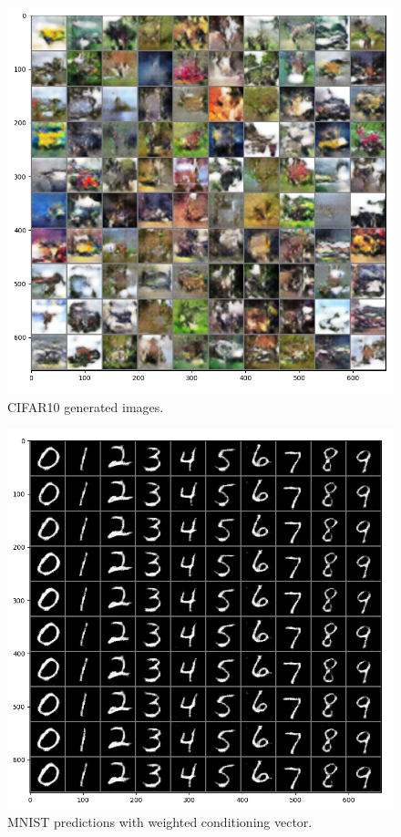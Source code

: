 \documentclass[10pt,twocolumn,letterpaper]{article}
\begin{document}
\begin{figure}[h!t]
   \centering
   \includegraphics[scale=0.39]{images/cifar.png}
   \caption{CIFAR10 generated images.}
   \label{fig:cifar}
\end{figure}

\begin{figure}[h!t]
   \centering
   \includegraphics[scale=0.39]{images/mnist-weighted.png}
   \caption{MNIST predictions with weighted conditioning vector.}
   \label{fig:mnist-weight}
\end{figure}
\end{document}
